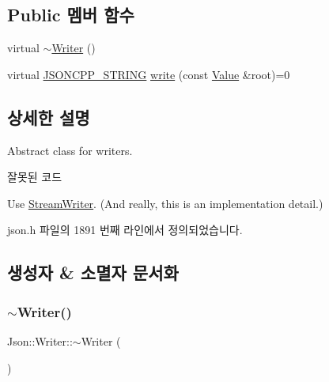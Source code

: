 \subsection*{Public 멤버 함수}
\begin{DoxyCompactItemize}
\item 
virtual \hyperlink{class_json_1_1_writer_a3e618564336f26b14921f0d840db668c}{$\sim$\+Writer} ()
\item 
virtual \hyperlink{json_8h_a1e723f95759de062585bc4a8fd3fa4be}{J\+S\+O\+N\+C\+P\+P\+\_\+\+S\+T\+R\+I\+NG} \hyperlink{class_json_1_1_writer_a61c55882b82c7651d0b9b683c6d3f371}{write} (const \hyperlink{class_json_1_1_value}{Value} \&root)=0
\end{DoxyCompactItemize}


\subsection{상세한 설명}
Abstract class for writers. 

\begin{DoxyRefDesc}{잘못된 코드}
\item[\hyperlink{deprecated__deprecated000007}{잘못된 코드}]Use \hyperlink{class_json_1_1_stream_writer}{Stream\+Writer}. (And really, this is an implementation detail.) \end{DoxyRefDesc}


json.\+h 파일의 1891 번째 라인에서 정의되었습니다.



\subsection{생성자 \& 소멸자 문서화}
\mbox{\label{class_json_1_1_writer_a3e618564336f26b14921f0d840db668c}} 
\subsubsection{\texorpdfstring{$\sim$\+Writer()}{~Writer()}}
{\footnotesize\ttfamily Json\+::\+Writer\+::$\sim$\+Writer (\begin{DoxyParamCaption}{ }\end{DoxyParamCaption})\hspace{0.3cm}{\ttfamily [virtual]}}



